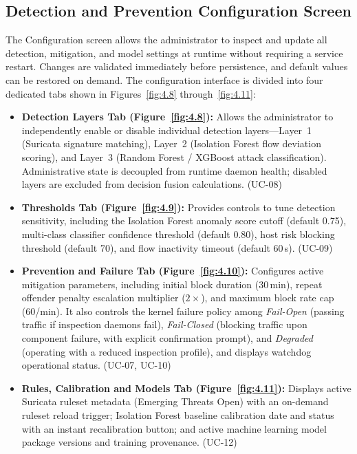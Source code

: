 \subsection{Detection and Prevention Configuration Screen}\label{sec:4.8.6}

\noindent The Configuration screen allows the administrator to inspect and update all detection, mitigation, and model settings at runtime without requiring a service restart. Changes are validated immediately before persistence, and default values can be restored on demand. The configuration interface is divided into four dedicated tabs shown in Figures~\ref{fig:4.8} through~\ref{fig:4.11}:

\begin{itemize}[leftmargin=*]
    \item \textbf{Detection Layers Tab (Figure~\ref{fig:4.8}):} Allows the administrator to independently enable or disable individual detection layers---Layer~1 (Suricata signature matching), Layer~2 (Isolation Forest flow deviation scoring), and Layer~3 (Random Forest / XGBoost attack classification). Administrative state is decoupled from runtime daemon health; disabled layers are excluded from decision fusion calculations. (UC-08)
    \item \textbf{Thresholds Tab (Figure~\ref{fig:4.9}):} Provides controls to tune detection sensitivity, including the Isolation Forest anomaly score cutoff (default 0.75), multi-class classifier confidence threshold (default 0.80), host risk blocking threshold (default 70), and flow inactivity timeout (default 60\,s). (UC-09)
    \item \textbf{Prevention and Failure Tab (Figure~\ref{fig:4.10}):} Configures active mitigation parameters, including initial block duration (30\,min), repeat offender penalty escalation multiplier ($2\times$), and maximum block rate cap (60/min). It also controls the kernel failure policy among \textit{Fail-Open} (passing traffic if inspection daemons fail), \textit{Fail-Closed} (blocking traffic upon component failure, with explicit confirmation prompt), and \textit{Degraded} (operating with a reduced inspection profile), and displays watchdog operational status. (UC-07, UC-10)
    \item \textbf{Rules, Calibration and Models Tab (Figure~\ref{fig:4.11}):} Displays active Suricata ruleset metadata (Emerging Threats Open) with an on-demand ruleset reload trigger; Isolation Forest baseline calibration date and status with an instant recalibration button; and active machine learning model package versions and training provenance. (UC-12)
\end{itemize}

